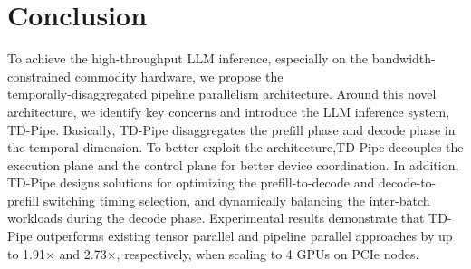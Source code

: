 \section{Conclusion}

To achieve the high-throughput LLM inference, especially on the bandwidth-constrained commodity hardware, we propose the \\temporally-disaggregated pipeline parallelism architecture.
Around this novel architecture, we identify key concerns and introduce the LLM inference system, TD-Pipe.
Basically, TD-Pipe disaggregates the prefill phase and decode phase in the temporal dimension.
To better exploit the architecture,TD-Pipe decouples the execution plane and the control plane for better device coordination.
In addition, TD-Pipe designs solutions for optimizing the prefill-to-decode and decode-to-prefill switching timing selection, and dynamically balancing the inter-batch workloads during the decode phase.
Experimental results demonstrate that TD-Pipe outperforms existing tensor parallel and pipeline parallel approaches by up to 1.91$\times$ and 2.73$\times$, respectively, when scaling to 4 GPUs on PCIe nodes.